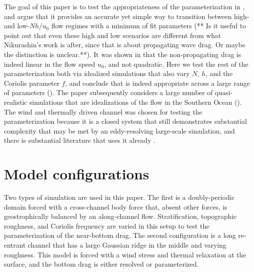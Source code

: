 \documentclass[twocol]{ametsocV5}
\begin{document}
The goal of this paper is to test the appropriateness of the parameterization in , and argue that it provides an accurate yet simple way to transition between high- and low-$Nh/u_0$ flow regimes with a minimum of fit parameters (** Is it useful to point out that even these high and low scenarios are different from what Nikurashin's work is after, since that is about propagating wave drag. Or maybe the distinction is unclear.**). It was shown in \citet{klymak18} that the non-propagating drag is indeed linear in the flow speed $u_0$, and not quadratic.  Here we test the rest of the parameterization both via idealized simulations that also vary $N$, $h$, and the Coriolis parameter $f$, and conclude that  is indeed appropriate across a large range of parameters (). 
The paper subsequently considers a large number of quasi-realistic simulations that are idealizations of the flow in the Southern Ocean  (). The wind and thermally driven channel was chosen for testing the parameterization because it is a closed system that still demonstrates substantial complexity that may be met by an eddy-resolving large-scale simulation, and there is substantial literature that uses it already \citep[i.e.][]{abernatheycessi14,Marshall_2017}.   
 
\section{Model configurations}
\label{sec:Model}

Two types of simulation are used in this paper.  The first is a doubly-periodic domain forced with a cross-channel body force that, absent other forces, is geostrophically balanced by an along-channel flow.  Stratification, topographic roughness, and Coriolis frequency are varied in this setup to test the parameterization of the near-bottom drag.  The second configuration is a long re-entrant channel that has a large Gaussian ridge in the middle and varying roughness. This model is forced with a wind stress and thermal relaxation at the surface, and the bottom drag is either resolved or parameterized.  
\end{document}
